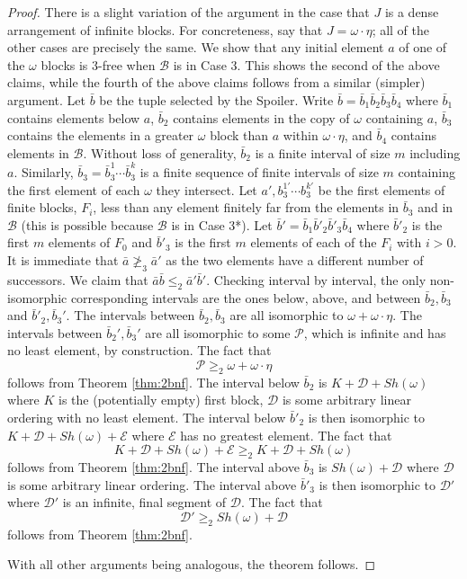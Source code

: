 \documentclass[11pt]{amsart}
\theoremstyle{definition}
\def\B{\mathcal{B}}
\def\D{{\mathcal D}}
\def\E{\mathcal{E}}
\def\P{{\mathcal P}}
\begin{document}
\begin{proof}
    There is a slight variation of the argument in the case that $J$ is a dense arrangement of infinite blocks.
    For concreteness, say that $J=\omega\cdot\eta$; all of the other cases are precisely the same.
    We show that any initial element $a$ of one of the $\omega$ blocks is 3-free when $\B$ is in Case 3.
    This shows the second of the above claims, while the fourth of the above claims follows from a similar (simpler) argument.
    Let $\bar{b}$ be the tuple selected by the Spoiler.
    Write $\bar{b}=\bar{b}_1\bar{b}_2\bar{b}_3\bar{b}_4$ where $\bar{b}_1$ contains elements below $a$, $\bar{b}_2$ contains elements in the copy of $\omega$ containing $a$, $\bar{b}_3$ contains the elements in a greater $\omega$ block than $a$ within $\omega\cdot\eta$, and $\bar{b}_4$ contains elements in $\B$.
    Without loss of generality, $\bar{b}_2$ is a finite interval of size $m$ including $a$.
    Similarly, $\bar{b}_3=\bar{b}_3^1\cdots\bar{b}_3^k$ is a finite sequence of finite intervals of size $m$ containing the first element of each $\omega$ they intersect.
    Let $a',b_3^{1'}\cdots b_3^{k'}$ be the first elements of finite blocks, $F_i$, less than any element finitely far from the elements in $\bar{b}_3$ and in $\B$ (this is possible because $\B$ is in Case 3*).
    Let $\bar{b}'=\bar{b}_1\bar{b}'_2\bar{b}'_3\bar{b}_4$ where $\bar{b}'_2$ is the first $m$ elements of $F_0$ and $\bar{b}'_3$ is the first $m$ elements of each of the $F_i$ with $i>0$.
    It is immediate that $\bar{a}\not\geq_3\bar{a}'$ as the two elements have a different number of successors. 
    We claim that $\bar{a}\bar{b}\leq_2\bar{a}'\bar{b}'$.
    Checking interval by interval, the only non-isomorphic corresponding intervals are the ones below, above, and between $\bar{b}_2,\bar{b}_3$ and $\bar{b}'_2,\bar{b}_3'$.
    The intervals between $\bar{b}_2,\bar{b}_3$ are all isomorphic to $\omega+\omega\cdot\eta$.
    The intervals between $\bar{b}_2',\bar{b}_3'$ are all isomorphic to some $\P$, which is infinite and has no least element, by construction.
    The fact that
    \[\P\geq_2 \omega+\omega\cdot\eta\]
    follows from Theorem \ref{thm:2bnf}.
    The interval below $\bar{b}_2$ is $K+\D+Sh(\omega)$ where $K$ is the (potentially empty) first block, $\D$ is some arbitrary linear ordering with no least element.
    The interval below $\bar{b}'_2$ is then isomorphic to $K+\D+Sh(\omega)+\E$ where $\E$ has no greatest element.
    The fact that
    \[K+\D+Sh(\omega)+\E \geq_2K+\D+Sh(\omega)\]
    follows from Theorem \ref{thm:2bnf}.
    The interval above $\bar{b}_3$ is $Sh(\omega)+\D$ where $\D$ is some arbitrary linear ordering.
    The interval above $\bar{b}'_3$ is then isomorphic to $\D'$ where $\D'$ is an infinite, final segment of $\D$.
    The fact that
    \[\D' \geq_2Sh(\omega)+\D\]
    follows from Theorem \ref{thm:2bnf}.

    With all other arguments being analogous, the theorem follows.
\end{proof}
\end{document}

